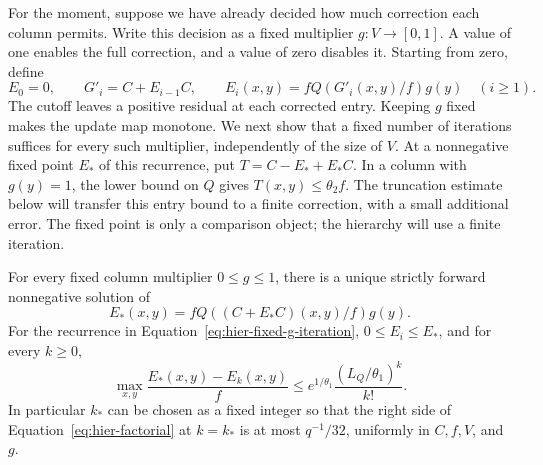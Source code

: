 For the moment, suppose we have already decided how much correction each column permits. Write this decision as a fixed multiplier $g:V\to[0,1]$. A value of one enables the full correction, and a value of zero disables it. Starting from zero, define
\begin{equation}
 E_0=0,\qquad G'_i=C+E_{i-1}C,\qquad
 E_i(x,y)=fQ(G'_i(x,y)/f)g(y)\quad(i\ge1).
 \label{eq:hier-fixed-g-iteration}
\end{equation}
The cutoff leaves a positive residual at each corrected entry.  Keeping
$g$ fixed makes the update map monotone.  We next show that a fixed
number of iterations suffices for every such multiplier, independently
of the size of $V$.  At a nonnegative fixed point $E_*$ of this recurrence, put
$T=C-E_*+E_*C$.  In a column with $g(y)=1$, the lower bound on $Q$
gives $T(x,y)\le\theta_2f$.  The truncation estimate below will transfer
this entry bound to a finite correction, with a small additional error.
The fixed point is only a comparison object; the hierarchy will use a
finite iteration.

\begin{lemma}
\label{lem:hier-fixed-point}
For every fixed column multiplier $0\leq g\leq1$, there is a unique
strictly forward nonnegative solution of
\begin{equation}
 E_*(x,y)=fQ((C+E_*C)(x,y)/f)g(y).
 \label{eq:hier-fixed-point}
\end{equation}
For the recurrence in Equation~\eqref{eq:hier-fixed-g-iteration}, $0\leq E_i\leq E_*$, and for every $k\geq0$,
\begin{equation}
 \max_{x,y}\frac{E_*(x,y)-E_k(x,y)}f
 \leq
 e^{1/\theta_1}\frac{(L_Q/\theta_1)^k}{k!}.
 \label{eq:hier-factorial}
\end{equation}
In particular $k_*$ can be chosen as a fixed integer so that the
right side of Equation~\eqref{eq:hier-factorial} at $k=k_*$ is at most
$q^{-1}/32$, uniformly in $C,f,V$, and $g$.
\end{lemma}

